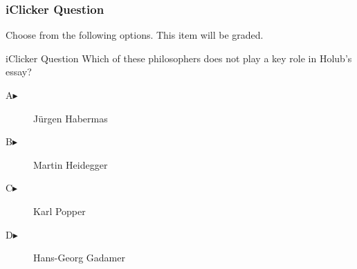 \begin{frame}
  \frametitle{iClicker Question}
Choose from the following options. This item will be graded.
\begin{block}{iClicker Question}
Which of these philosophers does not play a key role in Holub's essay?
\end{block}
\begin{description}
\item[A\hspace{.2in}$\blacktriangleright$] J{\"u}rgen Habermas
\item[B\hspace{.2in}$\blacktriangleright$] Martin Heidegger
\item[C\hspace{.2in}$\blacktriangleright$] Karl Popper
\item[D\hspace{.2in}$\blacktriangleright$] Hans-Georg Gadamer
\end{description}
\end{frame}
